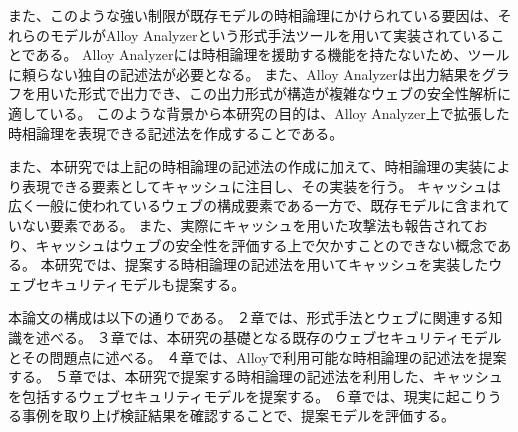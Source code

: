 \documentclass[12pt,a4paper]{jbook}
\begin{document}
また、このような強い制限が既存モデルの時相論理にかけられている要因は、それらのモデルがAlloy Analyzerという形式手法ツールを用いて実装されていることである。
Alloy Analyzerには時相論理を援助する機能を持たないため、ツールに頼らない独自の記述法が必要となる。
また、Alloy Analyzerは出力結果をグラフを用いた形式で出力でき、この出力形式が構造が複雑なウェブの安全性解析に適している。
このような背景から本研究の目的は、Alloy Analyzer上で拡張した時相論理を表現できる記述法を作成することである。

また、本研究では上記の時相論理の記述法の作成に加えて、時相論理の実装により表現できる要素としてキャッシュに注目し、その実装を行う。
キャッシュは広く一般に使われているウェブの構成要素である一方で、既存モデルに含まれていない要素である。
また、実際にキャッシュを用いた攻撃法\cite{bcpattack}も報告されており、キャッシュはウェブの安全性を評価する上で欠かすことのできない概念である。
本研究では、提案する時相論理の記述法を用いてキャッシュを実装したウェブセキュリティモデルも提案する。

本論文の構成は以下の通りである。
２章では、形式手法とウェブに関連する知識を述べる。
３章では、本研究の基礎となる既存のウェブセキュリティモデルとその問題点に述べる。
４章では、Alloyで利用可能な時相論理の記述法を提案する。
５章では、本研究で提案する時相論理の記述法を利用した、キャッシュを包括するウェブセキュリティモデルを提案する。
６章では、現実に起こりうる事例を取り上げ検証結果を確認することで、提案モデルを評価する。
\end{document}
